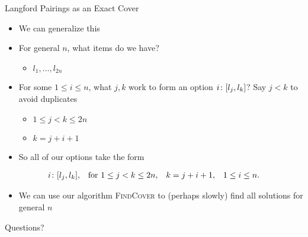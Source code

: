 \documentclass[aspectratio=169]{beamer}
\begin{document}
\begin{frame}{Langford Pairings as an Exact Cover}
    \begin{itemize}
        \item We can generalize this
        \item For general $n$, what items do we have? \pause
        \begin{itemize}
            \item $l_1, \ldots, l_{2n}$
        \end{itemize}
        \item For some $1 \leq i \leq n$, what $j, k$ work to form an option $i\colon \bqty{l_j, l_k}$? Say $j < k$ to avoid duplicates \pause
        \begin{itemize}
            \item $1 \leq j < k \leq 2n$ \pause
            \item $k = j + i + 1$ 
        \end{itemize}
        \item So all of our options take the form
    \end{itemize}
    \begin{align*}
        i\colon \bqty{l_j, l_k}, & & \text{for } 1 \leq j < k \leq 2n, & & k = j + i + 1, & & 1 \leq i \leq n.
    \end{align*}
    \begin{itemize}
        \item We can use our algorithm \textsc{FindCover} to (perhaps slowly) find all solutions for general $n$
    \end{itemize}
\end{frame}

\begin{frame}{}
      \begin{center}
    {\color{sigma@mainblue} \LARGE Questions?}
  \end{center}
\end{frame}
\end{document}
